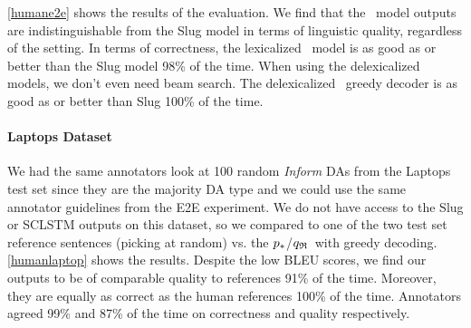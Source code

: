 \autoref{humane2e} shows the results of the evaluation.
We find that the \auggen~model outputs are indistinguishable from the Slug
model in terms of linguistic quality, regardless of the setting.
In terms of correctness, the lexicalized \auggen~model is as good as or better than the Slug model 98\%
of the time. 
When using the delexicalized models, we don't even need beam search.
The delexicalized \auggen~greedy decoder is as good as or better 
than Slug 100\% of the time.



\paragraph{Laptops Dataset} We had the same annotators look at 100 random 
\textit{Inform}
DAs from the Laptops test set since they are the majority DA type and we 
could use the same annotator
guidelines from the E2E experiment. We do not have access to the Slug
or SCLSTM outputs on this dataset, so we compared to one of the two
test set reference sentences (picking at random) vs. 
the $p_*$/${q_{\mathfrak{R}} }$~with greedy decoding. \autoref{humanlaptop}
shows the results. Despite the low BLEU scores, we find our outputs
to be of comparable quality to references 91\% of the time. Moreover,
they are equally as correct as the human references 100\% of the time.
Annotators agreed 99\% and 87\% of the time on correctness and quality 
respectively.



